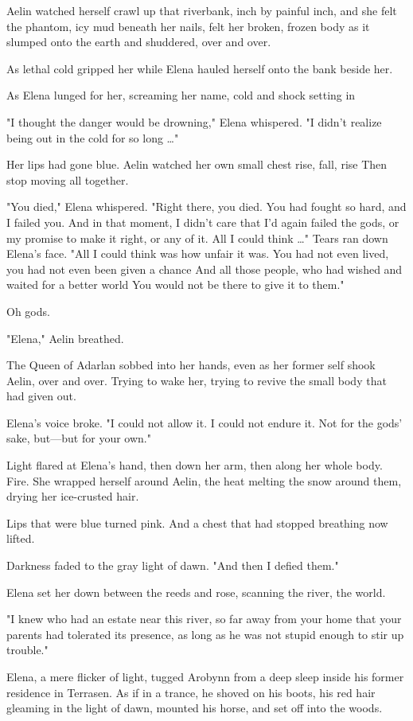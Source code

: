 Aelin watched herself crawl up that riverbank, inch by painful inch, and she felt the phantom, icy mud beneath her nails, felt her broken, frozen body as it slumped onto the earth and shuddered, over and over.

As lethal cold gripped her while Elena hauled herself onto the bank beside her.

As Elena lunged for her, screaming her name, cold and shock setting in


"I thought the danger would be drowning," Elena whispered. "I didn't realize being out in the cold for so long \ldots"

Her lips had gone blue. Aelin watched her own small chest rise, fall, rise  Then stop moving all together.

"You died," Elena whispered. "Right there, you died. You had fought so hard, and I failed you. And in that moment, I didn't care that I'd again failed the gods, or my promise to make it right, or any of it. All I could think \ldots" Tears ran down Elena's face. "All I could think was how unfair it was. You had not even lived, you had not even been given a chance  And all those people, who had wished and waited for a better world  You would not be there to give it to them."

Oh gods.

"Elena," Aelin breathed.

The Queen of Adarlan sobbed into her hands, even as her former self shook Aelin, over and over. Trying to wake her, trying to revive the small body that had given out.

Elena's voice broke. "I could not allow it. I could not endure it. Not for the gods' sake, but---but for your own."

Light flared at Elena's hand, then down her arm, then along her whole body. Fire. She wrapped herself around Aelin, the heat melting the snow around them, drying her ice-crusted hair.

Lips that were blue turned pink. And a chest that had stopped breathing now lifted.

Darkness faded to the gray light of dawn. "And then I defied them."

Elena set her down between the reeds and rose, scanning the river, the world.

"I knew who had an estate near this river, so far away from your home that your parents had tolerated its presence, as long as he was not stupid enough to stir up trouble."

Elena, a mere flicker of light, tugged Arobynn from a deep sleep inside his former residence in Terrasen. As if in a trance, he shoved on his boots, his red hair gleaming in the light of dawn, mounted his horse, and set off into the woods.

